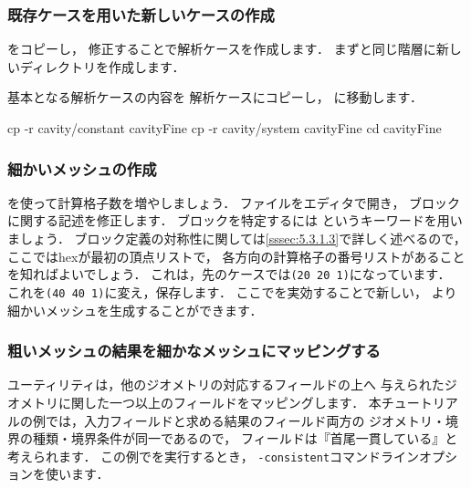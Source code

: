\subsubsection{既存ケースを用いた新しいケースの作成}
\label{sssec:2.1.5.1}
をコピーし，
修正することで解析ケースを作成します．
まずと同じ階層に新しいディレクトリを作成します．
基本となる解析ケースの内容を
解析ケースにコピーし，
に移動します．
\begin{OFverbatim}[terminal]
cp -r cavity/constant cavityFine
cp -r cavity/system cavityFine
cd cavityFine
\end{OFverbatim}

\subsubsection{細かいメッシュの作成}
\label{sssec:2.1.5.2}
を使って計算格子数を増やしましょう．
ファイルをエディタで開き，
ブロックに関する記述を修正します．
ブロックを特定するには
%
%
というキーワードを用いましょう．
ブロック定義の対称性に関しては\autoref{sssec:5.3.1.3}で詳しく述べるので，
ここではhexが最初の頂点リストで，
各方向の計算格子の番号リストがあることを知ればよいでしょう．
これは，先のケースでは\texttt{(20 20 1)}になっています．
これを\texttt{(40 40 1)}に変え，保存します．
ここでを実効することで新しい，
より細かいメッシュを生成することができます．

\subsubsection{粗いメッシュの結果を細かなメッシュにマッピングする}
\label{sssec:2.1.5.3}
%
%
ユーティリティは，他のジオメトリの対応するフィールドの上へ
与えられたジオメトリに関した一つ以上のフィールドをマッピングします．
本チュートリアルの例では，入力フィールドと求める結果のフィールド両方の
ジオメトリ・境界の種類・境界条件が同一であるので，
フィールドは『首尾一貫している』と考えられます．
この例でを実行するとき，
\texttt{-consistent}コマンドラインオプションを使います．

